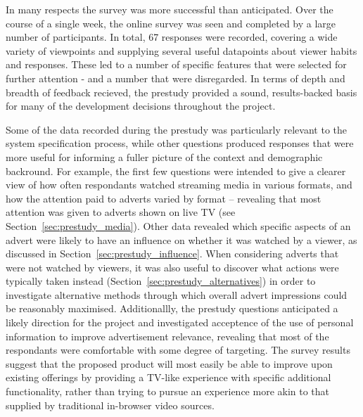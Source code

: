In many respects the survey was more successful than anticipated.
Over the course of a single week, the online survey was seen and completed by a large number of participants.
In total, 67 responses were recorded, covering a wide variety of viewpoints and supplying several useful datapoints about viewer habits and responses.
These led to a number of specific features that were selected for further attention - and a number that were disregarded.
In terms of depth and breadth of feedback recieved, the prestudy provided a sound, results-backed basis for many of the development decisions throughout the project.

Some of the data recorded during the prestudy was particularly relevant to the system specification process, while other questions produced responses that were more useful for informing a fuller picture of the context and demographic backround.
For example, the first few questions were intended to give a clearer view of how often respondants watched streaming media in various formats, and how the attention paid to adverts varied by format -- revealing that most attention was given to adverts shown on live TV (see Section~\ref{sec:prestudy_media}).
Other data revealed which specific aspects of an advert were likely to have an influence on whether it was watched by a viewer, as discussed in Section~\ref{sec:prestudy_influence}.
When considering adverts that were not watched by viewers, it was also useful to discover what actions were typically taken instead (Section~\ref{sec:prestudy_alternatives}) in order to investigate alternative methods through which overall advert impressions could be reasonably maximised.
Additionallly, the prestudy questions anticipated a likely direction for the project and investigated acceptence of the use of personal information to improve advertisement relevance, revealing that most of the respondants were comfortable with some degree of targeting.
The survey results suggest that the proposed product will most easily be able to improve upon existing offerings by providing a TV-like experience with specific additional functionality, rather than trying to pursue an experience more akin to that supplied by traditional in-browser video sources.

